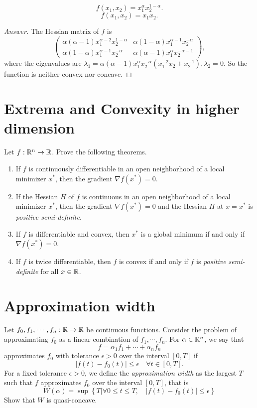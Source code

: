 \begin{enumerate}
	\[ f(x_1,x_2)=x_1^\alpha x_2^{1-\alpha}. \]
	\[ f(x_1,x_2)=x_1 x_2. \]
	\begin{proof}[Answer]
	The Hessian matrix of \(f\) is
	\[ \begin{pmatrix} \alpha(\alpha-1)x_1^{\alpha-2}x_2^{1-\alpha}  & \alpha(1-\alpha)x_1^{\alpha-1}x_2^{-\alpha} \\ \alpha(1-\alpha)x_1^{\alpha-1}x_2^{-\alpha} & \alpha(\alpha-1)x_1^{\alpha}x_2^{-\alpha-1} \end{pmatrix}, \]
	where the eigenvalues are \(\lambda_1=\alpha(\alpha-1)x_1^{\alpha}x_2^{-\alpha}\left(x_1^{-2}x_2+x_2^{-1}\right),\lambda_2=0\).
	So the function is neither convex nor concave.
	\end{proof}
\end{enumerate}


\section{Extrema and Convexity in higher dimension}
Let \(f: \mathbb{R}^n \to \mathbb{R}\). Prove the following theorems.
\begin{enumerate}
	\item If \(f\) is continuously differentiable in an open neighborhood of a local minimizer \(x^*\), then the gradient \(\nabla f(x^ *) = 0\).
	\item If the Hessian \(H\) of \(f\) is continuous in an open neighborhood of a local minimizer \(x^*\), then the gradient \(\nabla f(x^ *) = 0\) and the Hessian \(H\) at \(x=x^*\) is \emph{positive semi-definite}.
	\item If \(f\) is differentiable and convex, then \(x^*\) is a global minimum if and only if \(\nabla f(x^*) = 0\).
	\item If \(f\) is twice differentiable, then \(f\) is convex if and only if \(f\) is \emph{positive semi-definite} for all \(x \in \mathbb{R}\).
\end{enumerate}


\section{Approximation width}
Let \(f_0, f_1, \cdots, f_n: \mathbb{R} \to \mathbb{R}\) be continuous functions.
Consider the problem of approximating \(f_0\) as a linear combination of \(f_1, \cdots, f_n\).
For \(\alpha\in\mathbb{R}^n\), we say that
\[ f=\alpha_1f_1+\cdots+\alpha_n f_n \]
approximates \(f_0\) with tolerance \(\epsilon > 0\) over the interval \([0, T]\) if
\[ |f(t)-f_0(t)|\leq\epsilon \quad \forall t\in[0,T]. \]
For a fixed tolerance \(\epsilon > 0\), we define the \emph{approximation width} as the largest \(T\) such that \(f\) approximates \(f_0\) over the interval \([0, T]\), that is
\[ W(\alpha) = \sup \left\{ T | \forall 0 \leq t \leq T, \quad |f(t) - f_0(t)| \leq\epsilon \right\} \]
Show that \(W\) is quasi-concave.


